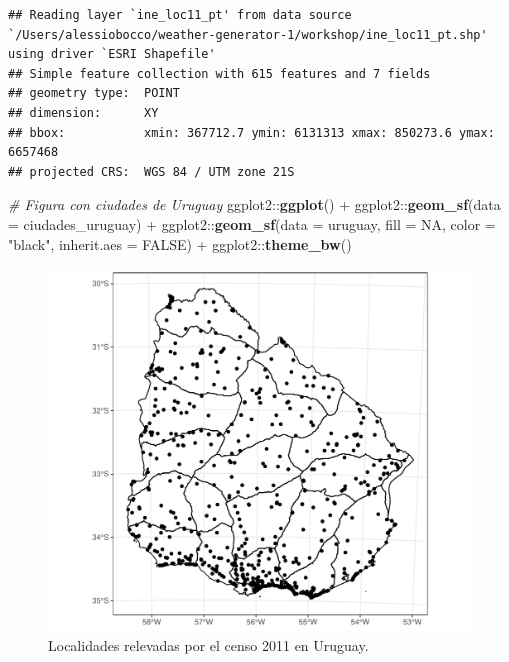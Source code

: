 \documentclass[
  12pt]{article}
\newenvironment{Shaded}{}{}
\newcommand{\CommentTok}[1]{\textcolor[rgb]{0.38,0.63,0.69}{\textit{#1}}}
\newcommand{\DataTypeTok}[1]{\textcolor[rgb]{0.56,0.13,0.00}{#1}}
\newcommand{\KeywordTok}[1]{\textcolor[rgb]{0.00,0.44,0.13}{\textbf{#1}}}
\newcommand{\NormalTok}[1]{#1}
\newcommand{\OperatorTok}[1]{\textcolor[rgb]{0.40,0.40,0.40}{#1}}
\newcommand{\OtherTok}[1]{\textcolor[rgb]{0.00,0.44,0.13}{#1}}
\newcommand{\StringTok}[1]{\textcolor[rgb]{0.25,0.44,0.63}{#1}}
\begin{document}
\begin{verbatim}
## Reading layer `ine_loc11_pt' from data source `/Users/alessiobocco/weather-generator-1/workshop/ine_loc11_pt.shp' using driver `ESRI Shapefile'
## Simple feature collection with 615 features and 7 fields
## geometry type:  POINT
## dimension:      XY
## bbox:           xmin: 367712.7 ymin: 6131313 xmax: 850273.6 ymax: 6657468
## projected CRS:  WGS 84 / UTM zone 21S
\end{verbatim}

\begin{Shaded}
\begin{Highlighting}[]
\CommentTok{# Figura con ciudades de Uruguay}
\NormalTok{ggplot2}\OperatorTok{::}\KeywordTok{ggplot}\NormalTok{() }\OperatorTok{+}
\StringTok{  }\NormalTok{ggplot2}\OperatorTok{::}\KeywordTok{geom_sf}\NormalTok{(}\DataTypeTok{data =}\NormalTok{ ciudades_uruguay) }\OperatorTok{+}
\StringTok{  }\NormalTok{ggplot2}\OperatorTok{::}\KeywordTok{geom_sf}\NormalTok{(}\DataTypeTok{data =}\NormalTok{ uruguay, }\DataTypeTok{fill =} \OtherTok{NA}\NormalTok{, }
                   \DataTypeTok{color =} \StringTok{"black"}\NormalTok{, }\DataTypeTok{inherit.aes =} \OtherTok{FALSE}\NormalTok{) }\OperatorTok{+}
\StringTok{  }\NormalTok{ggplot2}\OperatorTok{::}\KeywordTok{theme_bw}\NormalTok{()}
\end{Highlighting}
\end{Shaded}

\begin{figure}[H]

{\centering \includegraphics{Manual_Generador_files/figure-latex/localidades-uy-1} 

}

\caption{Localidades relevadas por el censo 2011 en Uruguay.}\label{fig:localidades-uy}
\end{figure}
\end{document}
